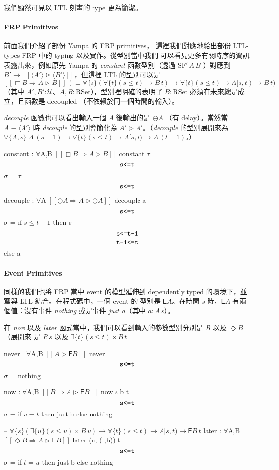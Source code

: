 \documentclass{article}
\newcommand{\llens}{[\![}
\newcommand{\rlens}{]\!]}
\newcommand{\TE}{\mathsf{E}}
\newcommand{\Wit}[1]{$\,\text{\texttt{#1}}\,$}
\newcommand{\U}{\mathcal{U}}
\newcommand{\Gt}{\tau}
\newcommand{\Gs}{\sigma}
\begin{document}
  我們顯然可見以 LTL 刻畫的 type 更為簡潔。

  \paragraph{FRP Primitives} 前面我們介紹了部份 Yampa 的 FRP primitives，
  這裡我們對應地給出部份 LTL-types-FRP 中的 typing 以及實作。從型別當中我們
  可以看見更多有關時序的資訊表露出來，例如原先 Yampa 的 \textit{constant}
  函數型別（透過 $\text{SF}'\,A\,B$ ）對應到$B'\to\llens \langle A'\rangle \unrhd \langle B'\rangle \rlens$，但這裡 LTL 的型別可以是 $\llens\Box B\Rightarrow A\rhd B\rlens\,(\equiv \forall\{s\}(\forall\{t\}(s\le t)\to B\,t)\to \forall\{t\}(s\le t)\to A[s,t)\to B\,t)$（其中 $A',B':\U$、$A,B:\text{RSet}$），型別裡明確的表明了 $B:\text{RSet}$ 必須在未來總是成立，且函數是
  decoupled （不依賴於同一個時間的輸入）。

  \textit{decouple} 函數也可以看出輸入一個 $A$ 後輸出的是 $\ominus A$
  （有 delay）。當然當 $A\equiv\langle A'\rangle$ 時 \textit{decouple}
  的型別會簡化為 $A'\rhd A'$。（\textit{decouple} 的型別展開來為
  $\forall\{A,s\}\; A\,(s-1)\to \forall\{t\}(s\le t)\to A[s,t) \to A\,(t-1)$。）

  \begin{code}
  constant : $\forall${A,B} $\llens \Box B\Rightarrow A\rhd B\rlens$
  constant $\Gt$ $\Wit{s<=t}$ $\Gs$ = $\Gt$ $\Wit{s<=t}$

  decouple : $\forall${A} $\llens\ominus A\Rightarrow A\rhd \ominus A\rlens$
  decouple a $\Wit{s<=t}$ $\Gs$ = if $s\le t-1$ then $\Gs$ $\Wit{s<=t-1}$ $\Wit{t-1<=t}$ else a
  \end{code}
  \paragraph{Event Primitives} 同樣的我們也將 FRP 當中 event 的模型延伸到
  dependently typed 的環境下，並寫與 LTL 結合。在程式碼中，一個 event 的
  型別是 $\TE A$。在時間 $s$ 時，$\TE A$ 有兩個值：沒有事件 \textit{nothing}
  或是事件 \textit{just a}（其中 $a:A\,s$）。

  在 \textit{now} 以及 \textit{later} 函式當中，我們可以看到輸入的參數型別分別是 $B$ 以及 $\Diamond B$（展開來
  是 $B\,s$ 以及 $\exists \{t\} (s\le t)\times B\,t$

  \begin{code}
  never : $\forall${A,B} $\llens A\rhd \TE B\rlens$
  never $\Wit{s<=t}$ $\Gs$ = nothing

  now : $\forall${A,B} $\llens B\Rightarrow A\rhd\TE B\rlens$
  now {s} b {t} $\Wit{s<=t}$ $\Gs$ = if $s=t$ then just b else nothing

  -- $\forall\{s\} (\exists \{u\} (s\le u)\times B\,u) \to \forall\{t\}(s\le t)\to A[s,t)\to \TE B\, t$
  later : $\forall${A,B} $\llens \Diamond B\Rightarrow A\rhd\TE B\rlens$
  later ({u}, ($\_$,b)) {t} $\Wit{s<=t}$ $\Gs$ = if $t = u$ then just b else nothing
  \end{code}
\end{document}
